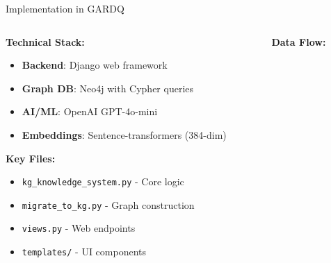\documentclass[10pt, aspectratio=169]{beamer}
\begin{document}
\begin{frame}{Implementation in GARDQ}
    \begin{columns}[T]
        \begin{column}{0.5\textwidth}
            \textbf{Technical Stack:}
            \begin{itemize}
                \footnotesize
                \item \textbf{Backend}: Django web framework
                \item \textbf{Graph DB}: Neo4j with Cypher queries
                \item \textbf{AI/ML}: OpenAI GPT-4o-mini
                \item \textbf{Embeddings}: Sentence-transformers (384-dim)
            \end{itemize}
            
            \vspace{0.3cm}
            \textbf{Key Files:}
            \begin{itemize}
                \footnotesize
                \item \texttt{kg\_knowledge\_system.py} - Core logic
                \item \texttt{migrate\_to\_kg.py} - Graph construction
                \item \texttt{views.py} - Web endpoints
                \item \texttt{templates/} - UI components
            \end{itemize}
        \end{column}
        
        \begin{column}{0.5\textwidth}
            \textbf{Data Flow:}
            \begin{center}
            \end{center}
            

\end{column}
\end{columns}
\end{frame}
\end{document}
